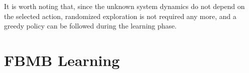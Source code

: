 It is worth noting that, since the unknown system dynamics do not depend on
the selected action, randomized exploration is not required any more, and a
greedy policy can be followed during the learning phase.

\section{FBMB Learning}
\label{reinforcement-learning-fbmb-learning}

\lipsum[1]